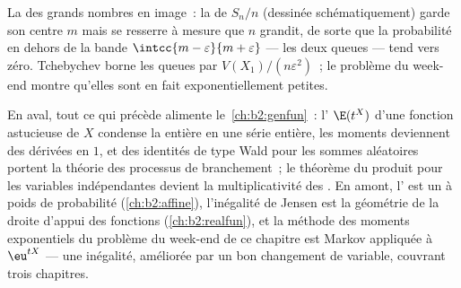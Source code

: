 \begin{omfigure}

{\small La  des grands nombres en image~: la  de
$S_n/n$ (dessinée schématiquement) garde son centre $m$ mais
se resserre à mesure que $n$ grandit, de sorte que la probabilité en dehors de la bande
$\intcc{m-\varepsilon}{m+\varepsilon}$ --- les deux queues ---
tend vers zéro. Tchebychev borne les queues par
$V(X_1)/(n\varepsilon^2)$~; le problème du week-end montre qu'elles sont
en fait exponentiellement petites.}
\end{omfigure}

\begin{remark}
En aval, tout ce qui précède alimente le~\cref{ch:b2:genfun}~:
l' $\E(t^X)$ d'une fonction astucieuse de $X$ condense
la  entière en une série entière, les moments deviennent des
dérivées en $1$, et des identités de type Wald pour les sommes
aléatoires portent la théorie des processus de branchement~; le
théorème du produit pour les variables indépendantes devient la
multiplicativité des . En amont, l'
est un  à poids de probabilité (\cref{ch:b2:affine}), l'inégalité de Jensen est la
géométrie de la droite d'appui des fonctions 
(\cref{ch:b2:realfun}), et la méthode des moments exponentiels du
problème du week-end de ce chapitre est Markov appliquée à
$\eu^{tX}$ --- une inégalité, améliorée par un bon changement
de variable, couvrant trois chapitres.
\end{remark}

